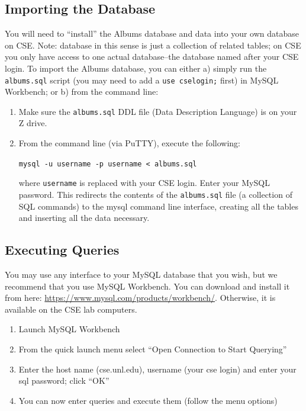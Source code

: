 \documentclass[12pt]{scrartcl}
\begin{document}
\subsection*{Importing the Database}

You will need to ``install'' the Albums database and data into your 
own database on CSE.  Note: database in this sense is just a collection 
of related tables; on CSE you only have access to one actual 
database--the database named after your CSE login.  To import the 
Albums database, you can either a) simply run the \texttt{albums.sql}
script (you may need to add a \texttt{use cselogin;} first)
in MySQL Workbench; or b) from the command line:

\begin{enumerate}
  \item Make sure the \texttt{albums.sql} DDL file (Data 
  	Description Language) is on your Z drive.  
  \item From the command line (via PuTTY), execute the following:
  
  \texttt{mysql -u username -p username < albums.sql}
  
  where \texttt{username} is replaced with your CSE login.
  Enter your MySQL password.  This redirects the contents of the 
  \texttt{albums.sql} file (a collection of SQL commands) 
  to the mysql command line interface, creating all the tables and 
  inserting all the data necessary.
\end{enumerate}
  
\subsection*{Executing Queries}

You may use any interface to your MySQL database that you wish, but 
we recommend that you use MySQL Workbench.  You can download and
install it from here: \url{https://www.mysql.com/products/workbench/}.
Otherwise, it is available on the CSE lab computers.

\begin{enumerate}
  \item Launch MySQL Workbench
  \item From the quick launch menu select ``Open Connection to Start Querying''
  \item Enter the host name (cse.unl.edu), username (your cse login) 
    and enter your sql password; click ``OK''
  \item You can now enter queries and execute them (follow the menu options)
\end{enumerate}
\end{document}
